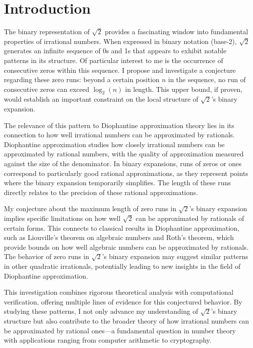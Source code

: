 \section{Introduction}
The binary representation of $\sqrt{2}$ provides a fascinating window into fundamental properties of irrational numbers. When expressed in binary notation (base-2), $\sqrt{2}$ generates an infinite sequence of 0s and 1s that appears to exhibit notable patterns in its structure. Of particular interest to me is the occurrence of consecutive zeros within this sequence. I propose and investigate a conjecture regarding these zero runs: beyond a certain position $n$ in the sequence, no run of consecutive zeros can exceed $\log_2(n)$ in length. This upper bound, if proven, would establish an important constraint on the local structure of $\sqrt{2}$'s binary expansion.

The relevance of this pattern to Diophantine approximation theory lies in its connection to how well irrational numbers can be approximated by rationals. Diophantine approximation studies how closely irrational numbers can be approximated by rational numbers, with the quality of approximation measured against the size of the denominator. In binary expansions, runs of zeros or ones correspond to particularly good rational approximations, as they represent points where the binary expansion temporarily simplifies. The length of these runs directly relates to the precision of these rational approximations.

My conjecture about the maximum length of zero runs in $\sqrt{2}$'s binary expansion implies specific limitations on how well $\sqrt{2}$ can be approximated by rationals of certain forms. This connects to classical results in Diophantine approximation, such as Liouville’s theorem on algebraic numbers and Roth’s theorem, which provide bounds on how well algebraic numbers can be approximated by rationals. The behavior of zero runs in $\sqrt{2}$'s binary expansion may suggest similar patterns in other quadratic irrationals, potentially leading to new insights in the field of Diophantine approximation.

This investigation combines rigorous theoretical analysis with computational verification, offering multiple lines of evidence for this conjectured behavior. By studying these patterns, I not only advance my understanding of $\sqrt{2}$'s binary structure but also contribute to the broader theory of how irrational numbers can be approximated by rational ones—a fundamental question in number theory with applications ranging from computer arithmetic to cryptography.
